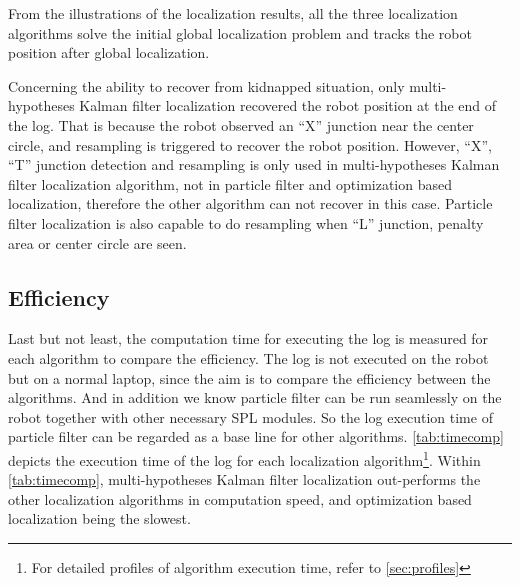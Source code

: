 From the illustrations of the localization results, all the three localization algorithms solve the initial global localization problem and tracks the robot position after global localization. 

Concerning the ability to recover from kidnapped situation, only multi-hypotheses Kalman filter localization recovered the robot position at the end of the log. That is because the robot observed an ``X'' junction near the center circle, and resampling is triggered to recover the robot position. However, ``X'', ``T'' junction detection and resampling is only used in multi-hypotheses Kalman filter localization algorithm, not in particle filter and optimization based localization, therefore the other algorithm can not recover in this case. Particle filter localization is also capable to do resampling when ``L'' junction, penalty area or center circle are seen.

\subsection{Efficiency}
\label{sub:Efficiency}
Last but not least, the computation time for executing the log is measured for each algorithm to compare the efficiency.  The log is not executed on the robot but on a normal laptop, since the aim is to compare the efficiency between the algorithms. And in addition we know particle filter can be run seamlessly on the robot together with other necessary \gls{SPL} modules. So the log execution time of particle filter can be regarded as a base line for other algorithms. \autoref{tab:timecomp} depicts the execution time of the log for each localization algorithm\footnote{For detailed profiles of algorithm execution time, refer to \autoref{sec:profiles}}. Within \autoref{tab:timecomp}, multi-hypotheses Kalman filter localization out-performs the other localization algorithms in computation speed, and optimization based localization being the slowest.




